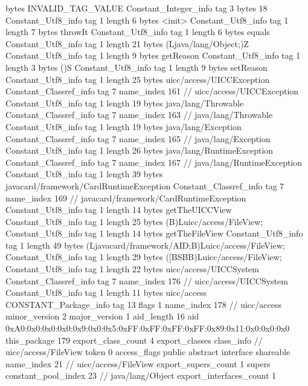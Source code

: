{{{			bytes	INVALID_TAG_VALUE
		}
		Constant_Integer_info {
			tag	3
			bytes	18
		}
		Constant_Utf8_info {
			tag	1
			length	6
			bytes	<init>
		}
		Constant_Utf8_info {
			tag	1
			length	7
			bytes	throwIt
		}
		Constant_Utf8_info {
			tag	1
			length	6
			bytes	equals
		}
		Constant_Utf8_info {
			tag	1
			length	21
			bytes	(Ljava/lang/Object;)Z
		}
		Constant_Utf8_info {
			tag	1
			length	9
			bytes	getReason
		}
		Constant_Utf8_info {
			tag	1
			length	3
			bytes	()S
		}
		Constant_Utf8_info {
			tag	1
			length	9
			bytes	setReason
		}
		Constant_Utf8_info {
			tag	1
			length	25
			bytes	uicc/access/UICCException
		}
		Constant_Classref_info {
			tag	7
			name_index	161		// uicc/access/UICCException
		}
		Constant_Utf8_info {
			tag	1
			length	19
			bytes	java/lang/Throwable
		}
		Constant_Classref_info {
			tag	7
			name_index	163		// java/lang/Throwable
		}
		Constant_Utf8_info {
			tag	1
			length	19
			bytes	java/lang/Exception
		}
		Constant_Classref_info {
			tag	7
			name_index	165		// java/lang/Exception
		}
		Constant_Utf8_info {
			tag	1
			length	26
			bytes	java/lang/RuntimeException
		}
		Constant_Classref_info {
			tag	7
			name_index	167		// java/lang/RuntimeException
		}
		Constant_Utf8_info {
			tag	1
			length	39
			bytes	javacard/framework/CardRuntimeException
		}
		Constant_Classref_info {
			tag	7
			name_index	169		// javacard/framework/CardRuntimeException
		}
		Constant_Utf8_info {
			tag	1
			length	14
			bytes	getTheUICCView
		}
		Constant_Utf8_info {
			tag	1
			length	25
			bytes	(B)Luicc/access/FileView;
		}
		Constant_Utf8_info {
			tag	1
			length	14
			bytes	getTheFileView
		}
		Constant_Utf8_info {
			tag	1
			length	49
			bytes	(Ljavacard/framework/AID;B)Luicc/access/FileView;
		}
		Constant_Utf8_info {
			tag	1
			length	29
			bytes	([BSBB)Luicc/access/FileView;
		}
		Constant_Utf8_info {
			tag	1
			length	22
			bytes	uicc/access/UICCSystem
		}
		Constant_Classref_info {
			tag	7
			name_index	176		// uicc/access/UICCSystem
		}
		Constant_Utf8_info {
			tag	1
			length	11
			bytes	uicc/access
		}
		CONSTANT_Package_info {
			tag	13
			flags	1
			name_index	178		// uicc/access
			minor_version	2
			major_version	1
			aid_length	16
			aid	0xA0:0x0:0x0:0x0:0x9:0x0:0x5:0xFF:0xFF:0xFF:0xFF:0x89:0x11:0x0:0x0:0x0
		}
	}
	this_package	179
	export_class_count	4
	export_classes {
		class_info {		// uicc/access/FileView
			token	0
			access_flags	public abstract interface shareable
			name_index	21		// uicc/access/FileView
			export_supers_count	1
			supers {
				constant_pool_index	23		// java/lang/Object
			}
			export_interfaces_count	1
}}}
